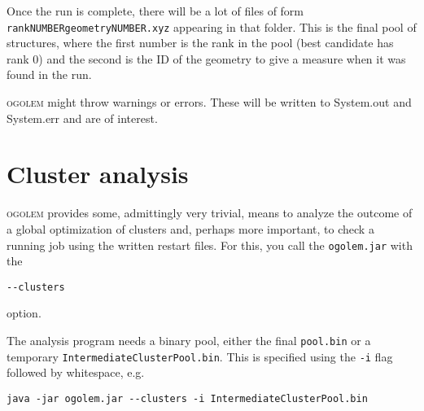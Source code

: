 \documentclass[a4paper,10pt]{scrbook}
\newcommand{\ogo}{\textsc{ogolem}}
\begin{document}
Once the run is complete, there will be a lot of files of form
\texttt{rankNUMBERgeometryNUMBER.xyz} appearing in that folder. This is the
final pool of structures, where the first number is the rank in the pool (best
candidate has rank 0) and the second is the ID of the geometry to give a measure
when it was found in the run.

\ogo{} might throw warnings or errors. These will be written to System.out and
System.err and are of interest.

\section{Cluster analysis}
\ogo{} provides some, admittingly very trivial, means to analyze the outcome of
a global optimization of clusters and, perhaps more important, to check a
running job using the written restart files. For this, you call the
\texttt{ogolem.jar} with the
\begin{verbatim}
--clusters
\end{verbatim}
option.

The analysis program needs a binary pool, either the final \texttt{pool.bin}
or a temporary \texttt{IntermediateClusterPool.bin}. This is specified using the
\texttt{-i} flag followed by whitespace, e.g.
\begin{verbatim}
java -jar ogolem.jar --clusters -i IntermediateClusterPool.bin
\end{verbatim}
\end{document}
